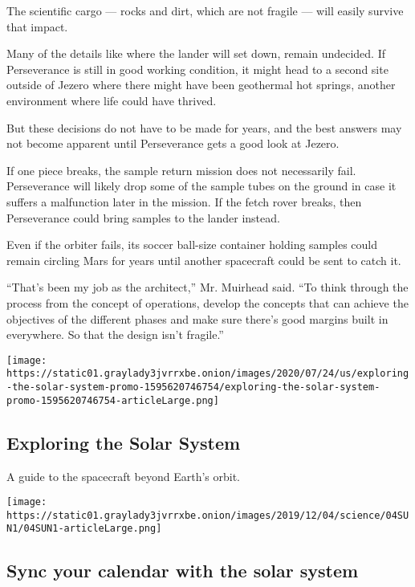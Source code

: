 The scientific cargo --- rocks and dirt, which are not fragile --- will
easily survive that impact.

Many of the details like where the lander will set down, remain
undecided. If Perseverance is still in good working condition, it might
head to a second site outside of Jezero where there might have been
geothermal hot springs, another environment where life could have
thrived.

But these decisions do not have to be made for years, and the best
answers may not become apparent until Perseverance gets a good look at
Jezero.

If one piece breaks, the sample return mission does not necessarily
fail. Perseverance will likely drop some of the sample tubes on the
ground in case it suffers a malfunction later in the mission. If the
fetch rover breaks, then Perseverance could bring samples to the lander
instead.

Even if the orbiter fails, its soccer ball-size container holding
samples could remain circling Mars for years until another spacecraft
could be sent to catch it.

``That's been my job as the architect,'' Mr. Muirhead said. ``To think
through the process from the concept of operations, develop the concepts
that can achieve the objectives of the different phases and make sure
there's good margins built in everywhere. So that the design isn't
fragile.''

\href{https://www.nytimes3xbfgragh.onion/interactive/2020/science/exploring-the-solar-system.html}{}

\texttt{[image: https://static01.graylady3jvrrxbe.onion/images/2020/07/24/us/exploring-the-solar-system-promo-1595620746754/exploring-the-solar-system-promo-1595620746754-articleLarge.png]}

\hypertarget{exploring-the-solar-system}{%
\subsection{Exploring the Solar
System}\label{exploring-the-solar-system}}

A guide to the spacecraft beyond Earth's orbit.

\href{https://www.nytimes3xbfgragh.onion/interactive/2020/science/2020-astronomy-space-calendar.html}{}

\texttt{[image: https://static01.graylady3jvrrxbe.onion/images/2019/12/04/science/04SUN1/04SUN1-articleLarge.png]}

\hypertarget{sync-your-calendar-with-the-solar-system}{%
\subsection{Sync your calendar with the solar
system}\label{sync-your-calendar-with-the-solar-system}}

